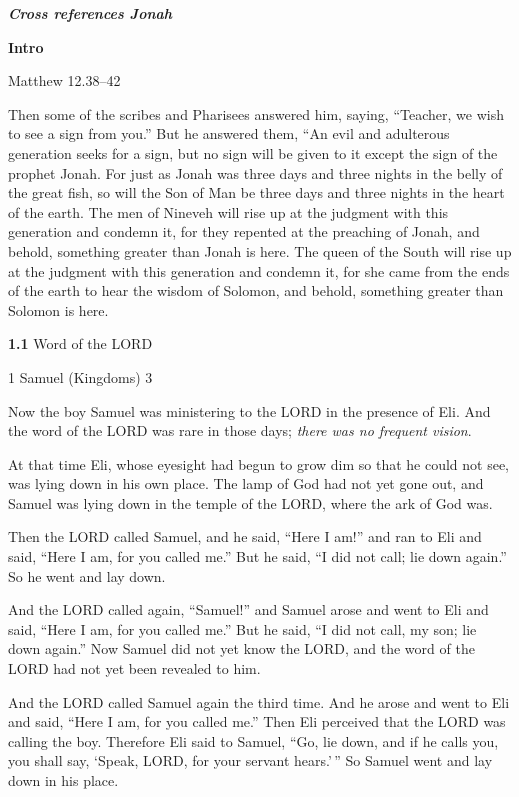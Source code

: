 \documentclass[
]{article}
\author{}
\date{}
\newcommand{\RL}[1]{\beginR #1\endR}
\begin{document}
\emph{\textbf{Cross references Jonah}}

\textbf{Intro}

Matthew 12.38--42

Then some of the scribes and Pharisees answered him, saying,
\RL{``}Teacher, we wish to see a sign from you.'' But he answered them,
\RL{``}An evil and adulterous generation seeks for a sign, but no sign
will be given to it except the sign of the prophet Jonah. For just as
Jonah was three days and three nights in the belly of the great fish, so
will the Son of Man be three days and three nights in the heart of the
earth. The men of Nineveh will rise up at the judgment with this
generation and condemn it, for they repented at the preaching of Jonah,
and behold, something greater than Jonah is here. The queen of the South
will rise up at the judgment with this generation and condemn it, for
she came from the ends of the earth to hear the wisdom of Solomon, and
behold, something greater than Solomon is here.

\textbf{1.1} Word of the LORD

1 Samuel (Kingdoms) 3

Now the boy Samuel was ministering to the LORD in the presence of Eli.
And the word of the LORD was rare in those days; \emph{there was no
frequent vision}.

At that time Eli, whose eyesight had begun to grow dim so that he could
not see, was lying down in his own place. The lamp of God had not yet
gone out, and Samuel was lying down in the temple of the LORD, where the
ark of God was.

Then the LORD called Samuel, and he said, \RL{``}Here I am!'' and ran to
Eli and said, \RL{``}Here I am, for you called me.'' But he said,
\RL{``}I did not call; lie down again.'' So he went and lay down.

And the LORD called again, \RL{``}Samuel!'' and Samuel arose and went to
Eli and said, \RL{``}Here I am, for you called me.'' But he said,
\RL{``}I did not call, my son; lie down again.'' Now Samuel did not yet
know the LORD, and the word of the LORD had not yet been revealed to
him.

And the LORD called Samuel again the third time. And he arose and went
to Eli and said, \RL{``}Here I am, for you called me.'' Then Eli
perceived that the LORD was calling the boy. Therefore Eli said to
Samuel, \RL{``}Go, lie down, and if he calls you, you shall say,
\RL{`}Speak, LORD, for your servant hears.'\,'' So Samuel went and lay
down in his place.
\end{document}
